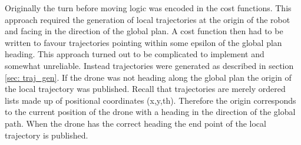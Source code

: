 \documentclass[capstone_report.tex]{subfiles}
\begin{document}
Originally the turn before moving logic was encoded in the cost functions.  This approach required the generation of local trajectories at the origin of the robot and facing in the direction of the global plan.  A cost function then had to be written to favour trajectories pointing within some epsilon of the global plan heading.  This approach turned out to be complicated to implement and somewhat unreliable.  Instead trajectories were generated as described in section \ref{sec: traj_gen}.  If the drone was not heading along the global plan the origin of the local trajectory was published.  Recall that trajectories are merely ordered lists made up of positional coordinates (x,y,th).  Therefore the origin corresponds to the current position of the drone with a heading in the direction of the global path.  When the drone has the correct heading the end point of the local trajectory is published.
\end{document}
